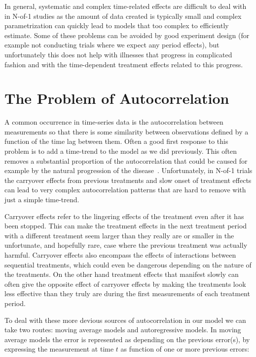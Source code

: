 \documentclass[12pt,a4paper,leqno]{report}
\theoremstyle{plain}
\theoremstyle{definition}
\theoremstyle{remark}
\begin{document}
In general, systematic and complex time-related effects are difficult to
deal with in N-of-1 studies as the amount of data created is typically small
and complex parametrization can quickly lead to models that too complex to efficiently
estimate. Some of these problems can be avoided by good experiment design (for example not
conducting trials where we expect any period effects), but unfortunately this does not
help with illnesses that progress in complicated fashion and with the time-dependent
treatment effects related to this progress.

\section{The Problem of Autocorrelation}\label{autocor}

A common occurrence in time-series data is the autocorrelation between
measurements so that there is some similarity between observations defined by a
function of the time lag between them. Often a good first response to this problem
is to add a time-trend to the model as we did previously. This
often removes a substantial proportion of the autocorrelation that could be
caused for example by the natural progression of the disease\ \cite{stat}.
Unfortunately, in N-of-1 trials the carryover effects
from previous treatments and slow onset of treatment effects can lead to very
complex autocorrelation patterns that are hard to remove with just a simple time-trend.

Carryover effects refer to the lingering effects of the treatment even after it
has been stopped. This can make the treatment effects in the next treatment period
with a different treatment seem larger than they really are or smaller in the
unfortunate, and hopefully rare, case where the previous treatment was actually
harmful. Carryover effects also encompass the effects of interactions between
sequential treatments, which could even be dangerous depending on the nature of
the treatments. On the other hand treatment effects that manifest slowly can
often give the opposite effect of carryover effects by making the treatments
look less effective than they truly are during the first measurements of each
treatment period.\cite{stat}

To deal with these more devious sources of autocorrelation in our model we can
take two routes: moving average models and autoregressive models. In moving
average models the error is represented as depending on the previous error(s), by
expressing the measurement at time \(t\) as function of one or more previous
errors:
\end{document}

